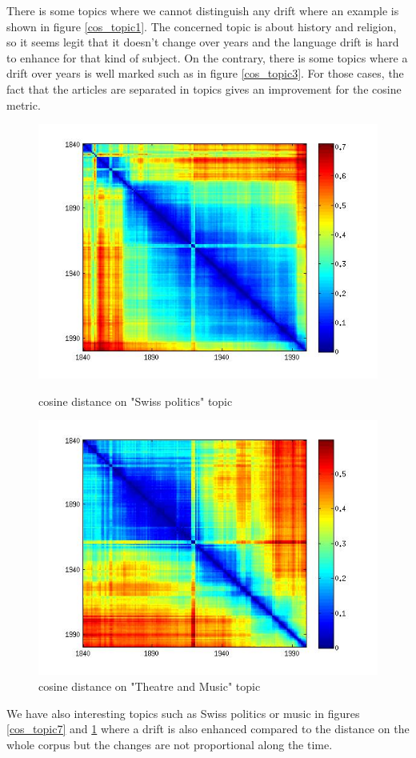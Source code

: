There is some topics where we cannot distinguish any drift where an example is shown in figure \ref{cos_topic1}. The concerned topic is about history and religion, so it seems legit that it doesn't change over years and the language drift is hard to enhance for that kind of subject. On the contrary, there is some topics where a drift over years is well marked such as in figure \ref{cos_topic3}. For those cases, the fact that the articles are separated in topics gives an improvement for the cosine metric.

\begin{figure}[H]
    \begin{minipage}[b]{0.48\linewidth}
        \includegraphics[scale=0.3]{Pictures/topics/cos/topic7.jpg}
        \caption{cosine distance on "Swiss politics" topic}
        \label{cos_topic7}
    \end{minipage}\hfill
    \begin{minipage}[b]{0.5\linewidth}
        \includegraphics[scale=0.3]{Pictures/topics/cos/topic9.jpg}
        \caption{cosine distance on "Theatre and Music" topic}
        \label{cos_topic9}
    \end{minipage}\hfill
\end{figure}

We have also interesting topics such as Swiss politics or music in figures \ref{cos_topic7} and \ref{cos_topic9} where a drift is also enhanced compared to the distance on the whole corpus but the changes are not proportional along the time.